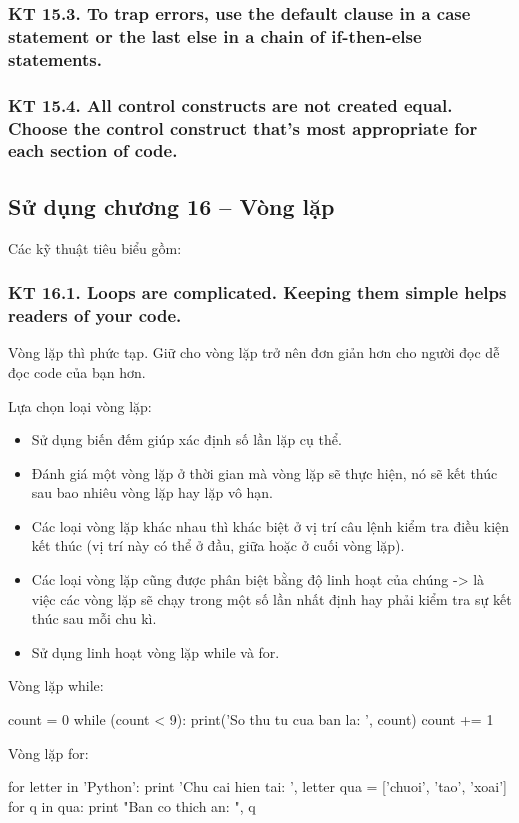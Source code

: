 \documentclass[12pt]{report}
\begin{document}
\subsubsection{KT 15.3. To trap errors, use the default clause in a case statement or the last else in a chain of if-then-else statements.}

\subsubsection{KT 15.4. All control constructs are not created equal. Choose the control construct that's most appropriate for each section of code.}


\subsection{Sử dụng chương 16 – Vòng lặp}
\noindent Các kỹ thuật tiêu biểu gồm: 

\subsubsection{KT 16.1. Loops are complicated. Keeping them simple helps readers of your code.}
Vòng lặp thì phức tạp. Giữ cho vòng lặp trở nên đơn giản hơn cho người đọc dễ đọc code của bạn hơn.
\vspace*{3mm}

Lựa chọn loại vòng lặp:
\begin{itemize}
	\item Sử dụng biến đếm giúp xác định số lần lặp cụ thể.
	\item Đánh giá một vòng lặp ở thời gian mà vòng lặp sẽ thực hiện, nó sẽ kết thúc sau bao nhiêu vòng lặp hay lặp vô hạn.
	\item Các loại vòng lặp khác nhau thì khác biệt ở vị trí câu lệnh kiểm tra điều kiện kết thúc (vị trí này có thể ở đầu, giữa hoặc ở cuối vòng lặp).
	\item Các loại vòng lặp cũng được phân biệt bằng độ linh hoạt của chúng -> là việc các vòng lặp sẽ chạy trong một số lần nhất định hay phải kiểm tra sự kết thúc sau mỗi chu kì.
	\item Sử dụng linh hoạt vòng lặp while và for.
\end{itemize}
Vòng lặp while: 
\begin{python}
count = 0
while (count < 9):
	print('So thu tu cua ban la: ', count)
	count += 1
\end{python}
Vòng lặp for:
\begin{python}
for letter in 'Python':
	print 'Chu cai hien tai: ', letter
qua = ['chuoi', 'tao', 'xoai']
for q in qua:
	print "Ban co thich an: ", q
\end{python}
\end{document}
